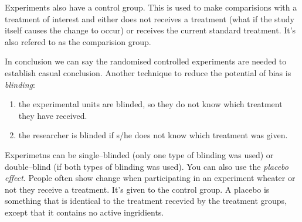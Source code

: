 Experiments also have a control group. This is used to make comparisions with a
treatment of interest and either does not receives a treatment (what if the
study itself causes the change to occur) or receives the current standard
treatment. It's also refered to as the comparision group.

In conclusion we can say the randomised controlled experiments are needed to
establish casual conclusion. Another technique to reduce the potential of bias
is \emph{blinding}:
\begin{enumerate}
	\item the experimental units are blinded, so they do not know which treatment
	      they have received.
	\item the researcher is blinded if s/he does not know which treatment was
	      given.
\end{enumerate}

Experimetns can be single--blinded (only one type of blinding was used) or
double--blind (if both types of blinding was used). You can also use the
\emph{placebo effect}. People often show change when participating in an
experiment wheater or not they receive a treatment. It's given to the control
group. A placebo is something that is identical to the treatment recevied by the
treatment groups, except that it contains no active ingridients.
